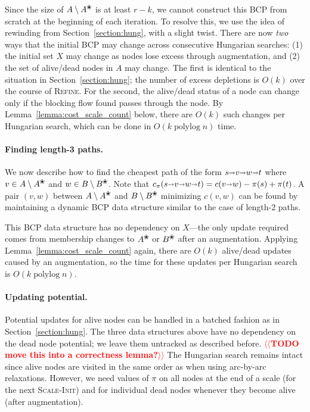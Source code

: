\documentclass[11pt]{article}
\makeatletter
\def\polylog{\mathop{\mathrm{polylog}}}
\def\arcto{\mathord\shortrightarrow}
\def\arc#1#2{#1\arcto#2}
\def\alive#1{{#1}^\text{\ding{96}}}
\def\dead#1{{#1} \setminus \alive{#1}}
\theoremstyle{plain}
\numberwithin{figure}{section}
\def\n@te#1{\textsf{\boldmath \textbf{$\langle\!\langle$#1$\rangle\!\rangle$}}\leavevmode}
\def\note#1{\textcolor{red}{\n@te{#1}}}
\makeatother
\begin{document}
Since the size of $\dead{A}$ is at least $r-k$, we cannot
construct this BCP from scratch at the beginning of each iteration.
To resolve this, we use the idea of rewinding from Section~\ref{section:hung},
with a slight twist.
There are now \emph{two} ways that the initial BCP may change across
consecutive Hungarian searches: (1) the initial set $X$ may change as nodes
lose excess through augmentation, and (2) the set of alive/dead nodes in $A$ may
change.
The first is identical to the situation in Section~\ref{section:hung};
the number of excess depletions is $O(k)$ over the course of \textsc{Refine}.
For the second, the alive/dead status of a node can change only if the
blocking flow found passes through the node.
By Lemma~\ref{lemma:cost_scale_count} below, there are $O(k)$ such changes per Hungarian search,
which can be done in $O(k\polylog n)$ time.

\paragraph*{Finding length-3 paths.}
We now describe how to find the cheapest path of the form $s \arcto v \arcto w \arcto t$
where $v \in \dead{A}$ and $w \in \dead{B}$.
Note that $c_\pi(s \arcto v \arcto w \arcto t) = c(\arc vw) - \pi(s) + \pi(t)$.
A pair $(v, w)$ between $\dead{A}$ and $\dead{B}$ minimizing $c(v, w)$
can be found by maintaining a dynamic BCP data structure similar to the
case of length-2 paths.

This BCP data structure has no dependency on $X$---the only update required comes from
membership changes to $\alive{A}$ or $\alive{B}$ after an augmentation.
Applying Lemma~\ref{lemma:cost_scale_count} again,
there are $O(k)$ alive/dead updates caused by an augmentation, so the time for
these updates per Hungarian search is $O(k\polylog n)$.

\paragraph*{Updating potential.}
Potential updates for alive nodes can be handled in a batched fashion as in Section~\ref{section:hung}.
The three data structures above have no dependency on the dead node potential;
we leave them untracked as described before.
\note{TODO move this into a correctness lemma?} %
The Hungarian search remains intact since alive nodes are visited
in the same order as when using arc-by-arc relaxations.
However, we need values of $\pi$ on all nodes at the end of a scale (for the
next \textsc{Scale-Init}) and for individual dead nodes whenever they become
alive (after augmentation).
\end{document}
